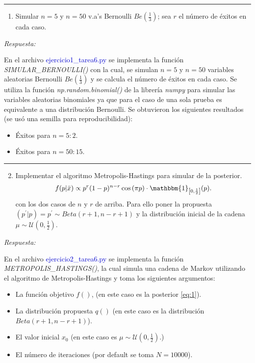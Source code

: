 \vspace{5mm}
{\color{lightgray} \hrule}
\begin{enumerate}
	\item Simular $n = 5$ y $n = 50$ v.a’s Bernoulli $Be\left(\frac{1}{3}\right)$; sea $r$ el número de éxitos en cada caso.
\end{enumerate}

\textcolor{BrickRed}{\it Respuesta:}

En el archivo \textcolor{mediumblue}{ejercicio1\_tarea6.py} se implementa la función \textit{SIMULAR\_BERNOULLI()} con la cual, se simulan $n = 5$ y $n = 50$ variables aleatorias Bernoulli $Be(\frac{1}{3})$ y se calcula el número de éxitos en cada caso. Se utiliza la función \textit{np.random.binomial()} de la librería \textit{numpy} para simular las variables aleatorias binomiales ya que para el caso de una sola prueba es equivalente a una distribución Bernoulli. Se obtuvieron los siguientes resultados (se usó una semilla para reproducibilidad):
\begin{itemize}
	\item Éxitos para $n = 5: 2$.
	\item Éxitos para $n = 50: 15$.
\end{itemize}

\vspace{5mm}
{\color{lightgray} \hrule}
\begin{enumerate} \setcounter{enumi}{1}
	\item Implementar el algoritmo Metropolis-Hastings para simular de la posterior.
	\begin{equation} \label{eq:1}
		f(p|\bar{x}) \propto p^{r} (1-p)^{n-r} \cos{(\pi p)} \cdot \mathbbm{1}_{\left[0,\frac{1}{2}\right]} (p).
	\end{equation}
	con los dos casos de $n$ y $r$ de arriba. Para ello poner la propuesta $\left(p^{'}|p\right) = p^{'} \sim Beta(r+1, n-r+1)$ y la distribución inicial de la cadena $\mu\sim\mathcal{U}\left(0,\frac{1}{2}\right)$.
\end{enumerate}

\textcolor{BrickRed}{\it Respuesta:}

En el archivo \textcolor{mediumblue}{ejercicio2\_tarea6.py} se implementa la función \textit{METROPOLIS\_HASTINGS()}, la cual simula una cadena de Markov utilizando el algoritmo de Metropolis-Hastings y toma los siguientes argumentos:
\begin{itemize}
	\item La función objetivo $f()$, (en este caso es la posterior \eqref{eq:1}).
	\item La distribución propuesta $q()$ (en este caso es la distribución $Beta(r+1, n-r+1)$).
	\item El valor inicial $x_0$ (en este caso es $\mu\sim\mathcal{U}\left(0,\frac{1}{2}\right)$.)
	\item El número de iteraciones (por default se toma $N=10000$).
\end{itemize}


